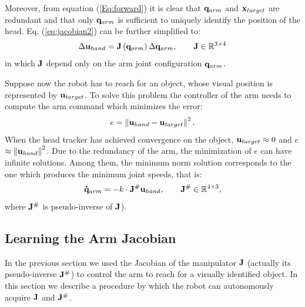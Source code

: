 Moreover, from equation (\ref{Eq:forward}) it is clear that 
$\mathbf q_{arm}$ and $\mathbf{x}_{target}$ are redundant and that only $\mathbf q_{arm}$ is 
sufficient to uniquely identify the position of the head. Eq.
(\ref{eq:jacobian2}) can be further simplified to:
%
\begin{equation} 
\label{eq:jacobian3}
  \Delta \mathbf {u}_{hand}=
  \mathbf J \left(\mathbf q_{arm}\right)
  \Delta \mathbf {q}_{arm},\qquad \mathbf J \in \mathbb R^{3\times4}
\end{equation}
%
in which $\mathbf J$ depend only on the arm joint configuration $\mathbf q_{arm}$.

Suppose now the robot has to reach for an object, whose visual position is 
represented by $\mathbf{u}_{target}$. To solve this problem 
the controller of the arm needs to compute the arm command which minimizes 
the error:
%
\begin{equation}
  e=\left\|\mathbf{u}_{hand}-\mathbf{u}_{target}\right\|^2.
\end{equation}
%
When the head tracker has achieved convergence on the object, 
$\mathbf{u}_{target} \approx 0 $ and $e$ $\approx \left\|\mathbf{u}_{hand}\right\|^2$.
Due to the redundancy of the arm, the minimization of $e$ can have
infinite solutions. Among them, the minimum norm solution corresponds
to the one which produces the minimum joint speeds, that is:
%
\begin{equation}
\mathbf{\dot q}_{arm}=-k \cdot \mathbf J^\# \mathbf{u}_{hand}, 
\qquad \mathbf J^\# \in \mathbb R^{4 \times 3},
\end{equation}
%
where $\mathbf J^\#$ is pseudo-inverse of $\mathbf J$).

\subsection{Learning the Arm Jacobian}
%
In the previous section we used the Jacobian of the manipulator
$\mathbf J$ (actually its pseudo-inverse $\mathbf J^\#$) to 
control the arm to reach for a visually identified object. In 
this section we describe a procedure by which the robot can 
autonomously acquire $\mathbf J$ and $\mathbf J^\#$.

